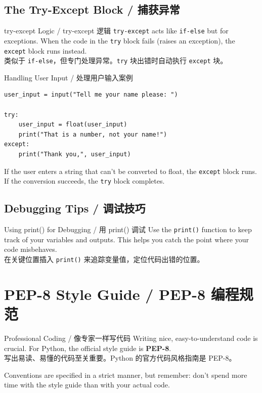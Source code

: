 \documentclass[11pt,a4paper]{report}
\let\oldtexttt\texttt
\renewcommand{\texttt}[1]{\textcolor{mainblue}{\oldtexttt{#1}}}
\begin{document}
\subsection{The Try-Except Block / 捕获异常}

\begin{concept}{try-except Logic / try-except 逻辑}
    \texttt{try-except} acts like \texttt{if-else} but for exceptions. When the code in the \texttt{try} block fails (raises an exception), the \texttt{except} block runs instead. \\
    类似于 \texttt{if-else}，但专门处理异常。\texttt{try} 块出错时自动执行 \texttt{except} 块。
\end{concept}

\begin{examplebox}{Handling User Input / 处理用户输入案例}
\begin{lstlisting}
user_input = input("Tell me your name please: ")

try:
    user_input = float(user_input)
    print("That is a number, not your name!")
except:
    print("Thank you,", user_input)
\end{lstlisting}
    If the user enters a string that can't be converted to float, the \texttt{except} block runs. If the conversion succeeds, the \texttt{try} block completes.
\end{examplebox}

\subsection{Debugging Tips / 调试技巧}

\begin{concept}{Using print() for Debugging / 用 print() 调试}
    Use the \texttt{print()} function to keep track of your variables and outputs. This helps you catch the point where your code misbehaves. \\
    在关键位置插入 \texttt{print()} 来追踪变量值，定位代码出错的位置。
\end{concept}

\section{PEP-8 Style Guide / PEP-8 编程规范}

\begin{concept}{Professional Coding / 像专家一样写代码}
    Writing nice, easy-to-understand code is crucial. For Python, the official style guide is \textbf{PEP-8}. \\
    写出易读、易懂的代码至关重要。Python 的官方代码风格指南是 PEP-8。

    Conventions are specified in a strict manner, but remember: don't spend more time with the style guide than with your actual code.
\end{concept}
\end{document}
